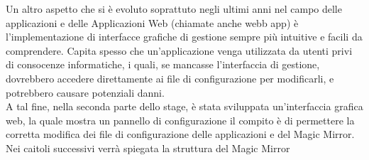 Un altro aspetto che si \`e evoluto soprattuto negli ultimi anni nel campo
delle applicazioni e delle Applicazioni Web (chiamate anche webb app)
\`e l'implementazione di interfacce grafiche di gestione sempre pi\`u
intuitive e facili da comprendere. Capita spesso che un'applicazione
venga utilizzata da utenti privi di consocenze informatiche, i quali, se mancasse
l'interfaccia di gestione, dovrebbero accedere direttamente ai file di configurazione
per modificarli, e potrebbero causare potenziali danni.\\
A tal fine, nella seconda parte dello stage,
\`e stata sviluppata un'interfaccia grafica web, la quale mostra un pannello di configurazione
il compito \`e di permettere la corretta modifica dei file di configurazione delle applicazioni
e del Magic Mirror.
\\[2\baselineskip]
Nei caitoli successivi verrà spiegata la struttura del Magic Mirror
